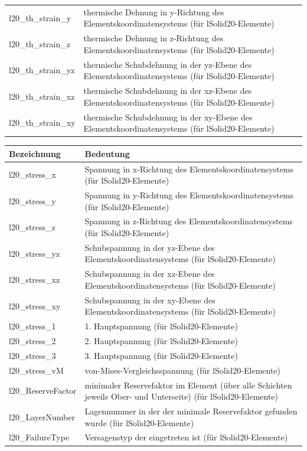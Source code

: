 \documentclass[11pt,titlepage,listof=totoc,bibliography=totoc,twoside]{scrreprt}
\begin{document}
{{\begin{tabularx}{\textwidth}{lX}
l20\_th\_strain\_y	& thermische Dehnung in y-Richtung des Elementskoordinatensystems (für lSolid20-Elemente) \\
l20\_th\_strain\_z	& thermische Dehnung in z-Richtung des Elementskoordinatensystems (für lSolid20-Elemente) \\
l20\_th\_strain\_yz	& thermische Schubdehnung in der yz-Ebene des Elementskoordinatensystems (für lSolid20-Elemente) \\
l20\_th\_strain\_xz	& thermische Schubdehnung in der xz-Ebene des Elementskoordinatensystems (für lSolid20-Elemente) \\
l20\_th\_strain\_xy	& thermische Schubdehnung in der xy-Ebene des Elementskoordinatensystems (für lSolid20-Elemente) \\
\bottomrule
\end{tabularx}

\begin{tabularx}{\textwidth}{lX}
\toprule
Bezeichnung		& Bedeutung	\\
\midrule
l20\_stress\_x		& Spannung in x-Richtung des Elementskoordinatensystems (für lSolid20-Elemente) \\
l20\_stress\_y		& Spannung in y-Richtung des Elementskoordinatensystems (für lSolid20-Elemente) \\
l20\_stress\_z		& Spannung in z-Richtung des Elementskoordinatensystems (für lSolid20-Elemente) \\
l20\_stress\_yz		& Schubspannung in der yz-Ebene des Elementskoordinatensystems (für lSolid20-Elemente) \\
l20\_stress\_xz		& Schubspannung in der xz-Ebene des Elementskoordinatensystems (für lSolid20-Elemente) \\
l20\_stress\_xy		& Schubspannung in der xy-Ebene des Elementskoordinatensystems (für lSolid20-Elemente) \\
l20\_stress\_1		& 1. Hauptspannung (für lSolid20-Elemente) \\
l20\_stress\_2		& 2. Hauptspannung (für lSolid20-Elemente) \\
l20\_stress\_3		& 3. Hauptspannung (für lSolid20-Elemente) \\
l20\_stress\_vM		& von-Mises-Vergleichsspannung (für lSolid20-Elemente) \\
l20\_ReserveFactor	& minimaler Reservefaktor im Element (über alle Schichten jeweils Ober- und Unterseite) (für lSolid20-Elemente) \\
l20\_LayerNumber	& Lagennummer in der der minimale Reservefaktor gefunden wurde (für lSolid20-Elemente) \\
l20\_FailureType	& Versagenstyp der eingetreten ist (für lSolid20-Elemente) \\
\bottomrule
\end{tabularx}

}}
\end{document}

